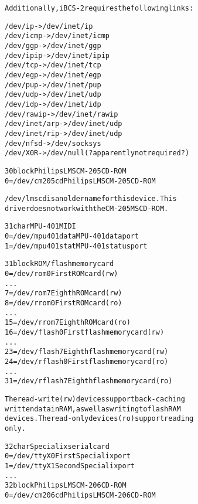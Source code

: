 \documentclass[a4paper,8pt,english]{sphinxmanual}
\begin{document}
\begin{alltt}
                Additionally, iBCS-2 requires the following links:

                /dev/ip -\textgreater{} /dev/inet/ip
                /dev/icmp -\textgreater{} /dev/inet/icmp
                /dev/ggp -\textgreater{} /dev/inet/ggp
                /dev/ipip -\textgreater{} /dev/inet/ipip
                /dev/tcp -\textgreater{} /dev/inet/tcp
                /dev/egp -\textgreater{} /dev/inet/egp
                /dev/pup -\textgreater{} /dev/inet/pup
                /dev/udp -\textgreater{} /dev/inet/udp
                /dev/idp -\textgreater{} /dev/inet/idp
                /dev/rawip -\textgreater{} /dev/inet/rawip
                /dev/inet/arp -\textgreater{} /dev/inet/udp
                /dev/inet/rip -\textgreater{} /dev/inet/udp
                /dev/nfsd -\textgreater{} /dev/socksys
                /dev/X0R -\textgreater{} /dev/null (? apparently not required ?)

  30 block      Philips LMS CM-205 CD-ROM
                  0 = /dev/cm205cd      Philips LMS CM-205 CD-ROM

                /dev/lmscd is an older name for this device.  This
                driver does not work with the CM-205MS CD-ROM.

  31 char       MPU-401 MIDI
                  0 = /dev/mpu401data   MPU-401 data port
                  1 = /dev/mpu401stat   MPU-401 status port

  31 block      ROM/flash memory card
                  0 = /dev/rom0         First ROM card (rw)
                      ...
                  7 = /dev/rom7         Eighth ROM card (rw)
                  8 = /dev/rrom0        First ROM card (ro)
                    ...
                 15 = /dev/rrom7        Eighth ROM card (ro)
                 16 = /dev/flash0       First flash memory card (rw)
                    ...
                 23 = /dev/flash7       Eighth flash memory card (rw)
                 24 = /dev/rflash0      First flash memory card (ro)
                    ...
                 31 = /dev/rflash7      Eighth flash memory card (ro)

                The read-write (rw) devices support back-caching
                written data in RAM, as well as writing to flash RAM
                devices.  The read-only devices (ro) support reading
                only.

  32 char       Specialix serial card
                  0 = /dev/ttyX0        First Specialix port
                  1 = /dev/ttyX1        Second Specialix port
                    ...
  32 block      Philips LMS CM-206 CD-ROM
                  0 = /dev/cm206cd      Philips LMS CM-206 CD-ROM


\end{alltt}
\end{document}

